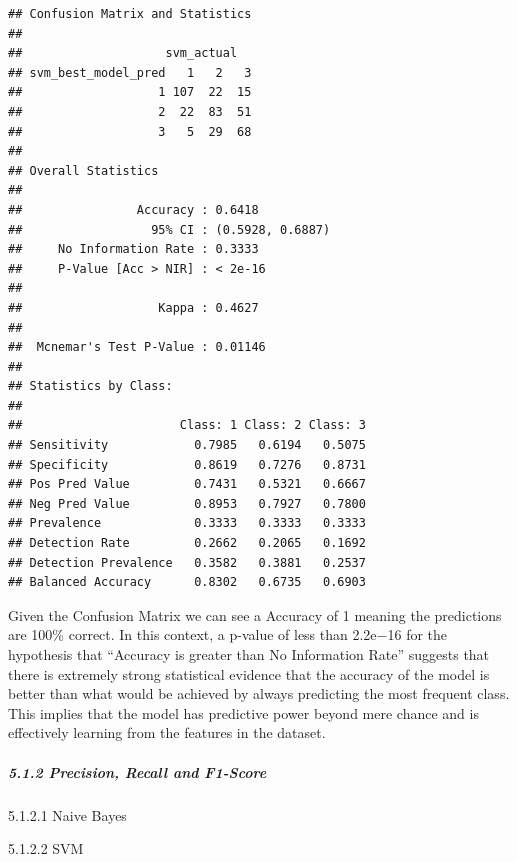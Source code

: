 \documentclass[
]{article}
\begin{document}
\begin{verbatim}
## Confusion Matrix and Statistics
## 
##                    svm_actual
## svm_best_model_pred   1   2   3
##                   1 107  22  15
##                   2  22  83  51
##                   3   5  29  68
## 
## Overall Statistics
##                                           
##                Accuracy : 0.6418          
##                  95% CI : (0.5928, 0.6887)
##     No Information Rate : 0.3333          
##     P-Value [Acc > NIR] : < 2e-16         
##                                           
##                   Kappa : 0.4627          
##                                           
##  Mcnemar's Test P-Value : 0.01146         
## 
## Statistics by Class:
## 
##                      Class: 1 Class: 2 Class: 3
## Sensitivity            0.7985   0.6194   0.5075
## Specificity            0.8619   0.7276   0.8731
## Pos Pred Value         0.7431   0.5321   0.6667
## Neg Pred Value         0.8953   0.7927   0.7800
## Prevalence             0.3333   0.3333   0.3333
## Detection Rate         0.2662   0.2065   0.1692
## Detection Prevalence   0.3582   0.3881   0.2537
## Balanced Accuracy      0.8302   0.6735   0.6903
\end{verbatim}

Given the Confusion Matrix we can see a Accuracy of 1 meaning the
predictions are 100\% correct. In this context, a p-value of less than
2.2e−16 for the hypothesis that ``Accuracy is greater than No
Information Rate'' suggests that there is extremely strong statistical
evidence that the accuracy of the model is better than what would be
achieved by always predicting the most frequent class. This implies that
the model has predictive power beyond mere chance and is effectively
learning from the features in the dataset.

\hypertarget{precision-recall-and-f1-score}{%
\subparagraph{5.1.2 Precision, Recall and
F1-Score}\label{precision-recall-and-f1-score}}

5.1.2.1 Naive Bayes

5.1.2.2 SVM
\end{document}
